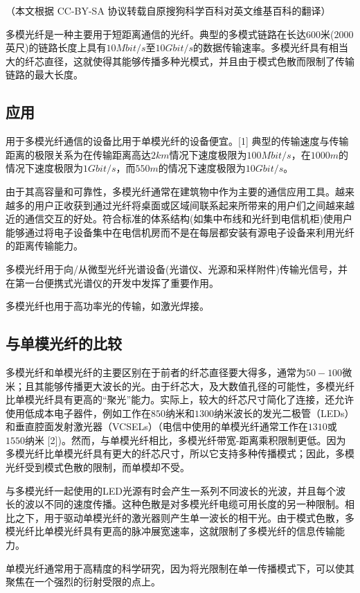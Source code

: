 
（本文根据 CC-BY-SA 协议转载自原搜狗科学百科对英文维基百科的翻译）

多模光纤是一种主要用于短距离通信的光纤。典型的多模式链路在长达$600$米($2000$英尺)的链路长度上具有$10 Mbit/s$至$10 Gbit/s$的数据传输速率。多模光纤具有相当大的纤芯直径，这就使得其能够传播多种光模式，并且由于模式色散而限制了传输链路的最大长度。

\subsection{应用}
用于多模光纤通信的设备比用于单模光纤的设备便宜。[1] 典型的传输速度与传输距离的极限关系为在传输距离高达$2km$情况下速度极限为$100 Mbit/s$，在$1000m$的情况下速度极限为$1 Gbit/s$，而$550m$的情况下速度极限为$10 Gbit/s$。

由于其高容量和可靠性，多模光纤通常在建筑物中作为主要的通信应用工具。越来越多的用户正收获到通过光纤将桌面或区域间联系起来所带来的用户们之间越来越近的通信交互的好处。符合标准的体系结构(如集中布线和光纤到电信机柜)使用户能够通过将电子设备集中在电信机房而不是在每层都安装有源电子设备来利用光纤的距离传输能力。

多模光纤用于向/从微型光纤光谱设备(光谱仪、光源和采样附件)传输光信号，并在第一台便携式光谱仪的开发中发挥了重要作用。

多模光纤也用于高功率光的传输，如激光焊接。
\subsection{与单模光纤的比较}
多模光纤和单模光纤的主要区别在于前者的纤芯直径要大得多，通常为$50-100$微米；且其能够传播更大波长的光。由于纤芯大，及大数值孔径的可能性，多模光纤比单模光纤具有更高的“聚光”能力。实际上，较大的纤芯尺寸简化了连接，还允许使用低成本电子器件，例如工作在$850$纳米和$1300$纳米波长的发光二极管（LEDs）和垂直腔面发射激光器（VCSELs）（电信中使用的单模光纤通常工作在$1310$或$1550$纳米 [2])。然而，与单模光纤相比，多模光纤带宽-距离乘积限制更低。因为多模光纤比单模光纤具有更大的纤芯尺寸，所以它支持多种传播模式；因此，多模光纤受到模式色散的限制，而单模却不受。

与多模光纤一起使用的LED光源有时会产生一系列不同波长的光波，并且每个波长的波以不同的速度传播。这种色散是对多模光纤电缆可用长度的另一种限制。相比之下，用于驱动单模光纤的激光器则产生单一波长的相干光。由于模式色散，多模光纤比单模光纤具有更高的脉冲展宽速率，这就限制了多模光纤的信息传输能力。

单模光纤通常用于高精度的科学研究，因为将光限制在单一传播模式下，可以使其聚焦在一个强烈的衍射受限的点上。

